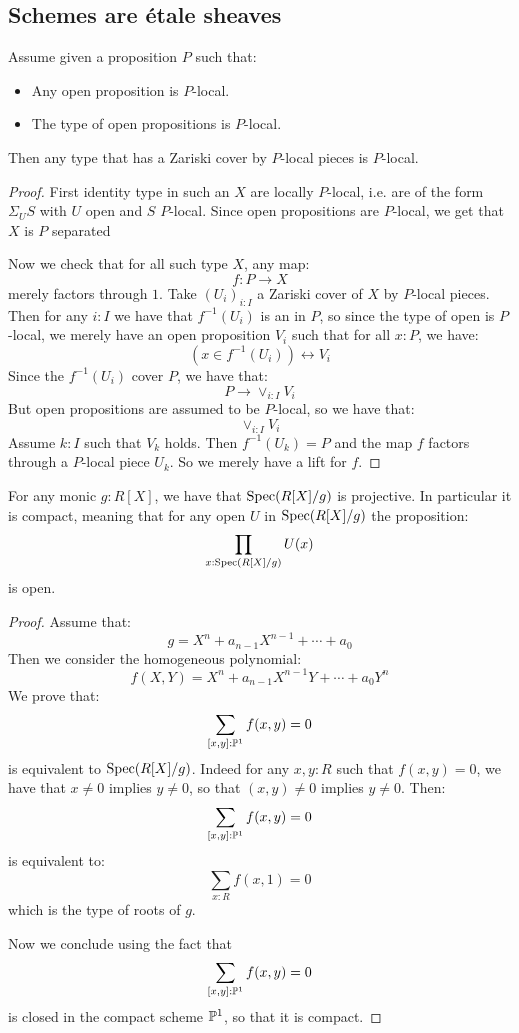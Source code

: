 \subsection{Schemes are \'etale sheaves}

\begin{lemma}\label{scheme-are-sheaf-from-affine}
Assume given a proposition $P$ such that:
\begin{itemize}
\item Any open proposition is $P$-local.
\item The type of open propositions is $P$-local.
\end{itemize}
Then any type that has a Zariski cover by $P$-local pieces is $P$-local.
\end{lemma}

\begin{proof}
First identity type in such an $X$ are locally $P$-local, i.e. are of the form $\Sigma_US$ with $U$ open and $S$ $P$-local. Since open propositions are $P$-local, we get that $X$ is $P$ separated

Now we check that for all such type $X$, any map:
\[f:P\to X\]
merely factors through $1$. Take $(U_i)_{i:I}$ a Zariski cover of $X$ by $P$-local pieces. Then for any $i:I$ we have that $f^{-1}(U_i)$ is an in $P$, so since the type of open is $P$-local, we merely have an open proposition $V_i$ such that for all $x:P$, we have:
\[(x\in f^{-1}(U_i) )\leftrightarrow V_i\]
Since the $f^{-1}(U_i)$ cover $P$, we have that:
\[P\to \lor_{i:I} V_i\]
But open propositions are assumed to be $P$-local, so we have that:
\[ \lor_{i:I} V_i\]
Assume $k:I$ such that $V_k$ holds. Then $f^{-1}(U_k) = P$ and the map $f$ factors through a $P$-local piece $U_k$. So we merely have a lift for $f$.
\end{proof}


\begin{lemma}\label{roots-monic-proper}
For any monic $g:R[X]$, we have that $\operatorname{Spec}(R[X]/g)$ is projective. In particular it is compact, meaning that for any open $U$ in $\operatorname{Spec}(R[X]/g)$ the proposition:
\[\prod_{x:\operatorname{Spec}(R[X]/g)}U(x)\]
is open.
\end{lemma}

\begin{proof}
Assume that:
\[g=X^n+a_{n-1}X^{n-1}+\cdots+a_0\]
Then we consider the homogeneous polynomial:
\[f(X,Y) = X^n + a_{n-1}X^{n-1}Y+\cdots+a_0Y^n\]
We prove that:
\[\sum_{[x,y]:\mathbb{P}^1}f(x,y) = 0\]
is equivalent to $\operatorname{Spec}(R[X]/g)$. Indeed for any $x,y:R$ such that $f(x,y)=0$, we have that $x\not=0$ implies $y\not=0$, so that $(x,y)\not=0$ implies $y\not=0$. Then:
\[\sum_{[x,y]:\mathbb{P}^1}f(x,y) = 0\]
is equivalent to:
\[\sum_{x:R} f(x,1)=0\]
which is the type of roots of $g$. 

Now we conclude using the fact that 
\[\sum_{[x,y]:\mathbb{P}^1}f(x,y) = 0\]
is closed in the compact scheme $\mathbb{P}^1$, so that it is compact.
\end{proof}

